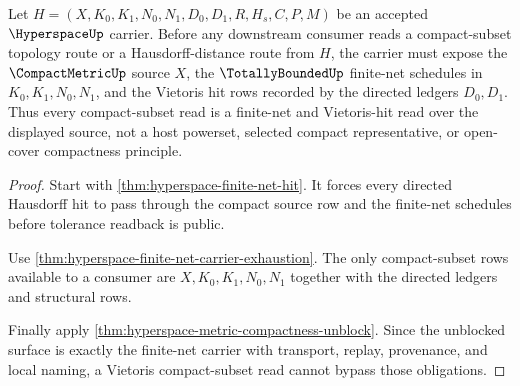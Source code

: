 \begin{theorem}
\label{thm:hyperspace-vietoris-finite-net-obligations}
Let $H=(X,K_0,K_1,N_0,N_1,D_0,D_1,R,H_s,C,P,M)$ be an accepted $\HyperspaceUp$ carrier. Before any downstream consumer reads a compact-subset topology route or a Hausdorff-distance route from $H$, the carrier must expose the $\CompactMetricUp$ source $X$, the $\TotallyBoundedUp$ finite-net schedules in $K_0,K_1,N_0,N_1$, and the Vietoris hit rows recorded by the directed ledgers $D_0,D_1$. Thus every compact-subset read is a finite-net and Vietoris-hit read over the displayed source, not a host powerset, selected compact representative, or open-cover compactness principle.
\end{theorem}
\begin{proof}
Start with \autoref{thm:hyperspace-finite-net-hit}. It forces every directed Hausdorff hit to pass through the compact source row and the finite-net schedules before tolerance readback is public.

Use \autoref{thm:hyperspace-finite-net-carrier-exhaustion}. The only compact-subset rows available to a consumer are $X,K_0,K_1,N_0,N_1$ together with the directed ledgers and structural rows.

Finally apply \autoref{thm:hyperspace-metric-compactness-unblock}. Since the unblocked surface is exactly the finite-net carrier with transport, replay, provenance, and local naming, a Vietoris compact-subset read cannot bypass those obligations.
\end{proof}

